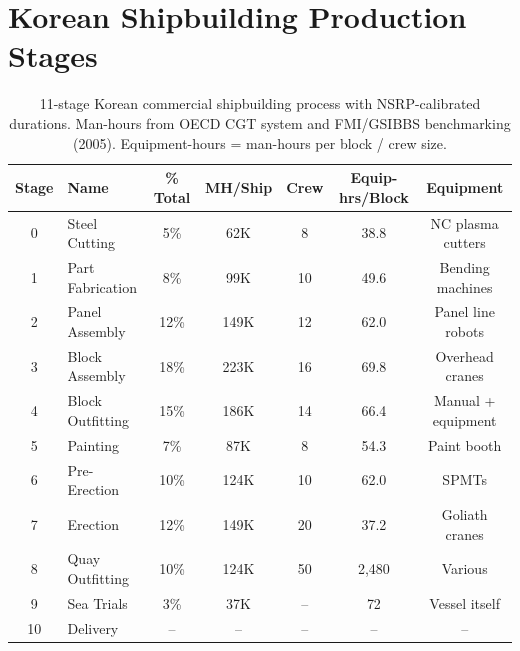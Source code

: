 \documentclass[11pt,a4paper]{article}
\begin{document}
\section{Korean Shipbuilding Production Stages}
\label{app:stages}

\begin{table}[h]
\centering
\caption{11-stage Korean commercial shipbuilding process with NSRP-calibrated durations. Man-hours from OECD CGT system and FMI/GSIBBS benchmarking (2005). Equipment-hours = man-hours per block / crew size.}
\label{tab:stages}
\begin{tabular}{clccccc}
\toprule
Stage & Name & \% Total & MH/Ship & Crew & Equip-hrs/Block & Equipment \\
\midrule
0 & Steel Cutting & 5\% & 62K & 8 & 38.8 & NC plasma cutters \\
1 & Part Fabrication & 8\% & 99K & 10 & 49.6 & Bending machines \\
2 & Panel Assembly & 12\% & 149K & 12 & 62.0 & Panel line robots \\
3 & Block Assembly & 18\% & 223K & 16 & 69.8 & Overhead cranes \\
4 & Block Outfitting & 15\% & 186K & 14 & 66.4 & Manual + equipment \\
5 & Painting & 7\% & 87K & 8 & 54.3 & Paint booth \\
6 & Pre-Erection & 10\% & 124K & 10 & 62.0 & SPMTs \\
7 & Erection & 12\% & 149K & 20 & 37.2 & Goliath cranes \\
8 & Quay Outfitting & 10\% & 124K & 50 & 2,480 & Various \\
9 & Sea Trials & 3\% & 37K & -- & 72 & Vessel itself \\
10 & Delivery & -- & -- & -- & -- & -- \\
\bottomrule
\end{tabular}
\end{table}
\end{document}
